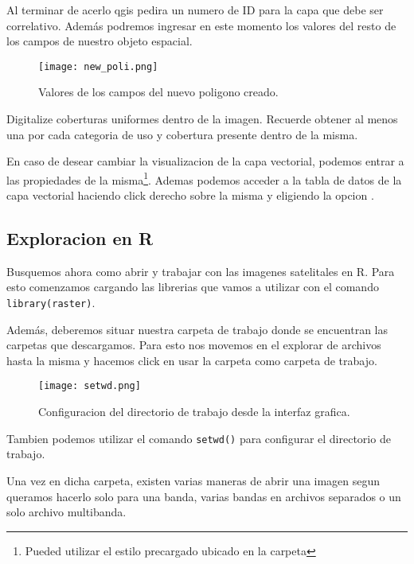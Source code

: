 Al terminar de acerlo qgis pedira un numero de ID para la capa que debe ser
correlativo. Además podremos ingresar en este momento los valores del resto de
los campos de nuestro objeto espacial.

\begin{figure}
\begin{center}
    \texttt{[image: new\_poli.png]}
\end{center}
    \caption{Valores de los campos del nuevo poligono creado.}
    \label{fig:newpoli}
\end{figure}

\begin{act}
   Digitalize coberturas uniformes dentro de la imagen. Recuerde obtener al
   menos una por cada categoria de uso y cobertura presente dentro de la misma.
\end{act}

En caso de desear cambiar la visualizacion de la capa vectorial, podemos entrar
a las propiedades de la misma\footnote{Pueded utilizar el estilo precargado
ubicado en la carpeta }. Ademas podemos acceder a la tabla de
datos de la capa vectorial haciendo click derecho sobre la misma y eligiendo la
opcion .

\subsection{Exploracion en R}
Busquemos ahora como abrir y trabajar con las imagenes satelitales en R. Para
esto comenzamos cargando las librerias que vamos a utilizar con el comando
\texttt{library(raster)}. 

Además, deberemos situar nuestra carpeta de trabajo donde se encuentran las
carpetas que descargamos. Para esto nos movemos en el explorar de archivos
hasta la misma y hacemos click en usar la carpeta como carpeta de trabajo.

\begin{figure}
\begin{center}
    \texttt{[image: setwd.png]}
\end{center}
\caption{Configuracion del directorio de trabajo desde la interfaz grafica.}
\label{fig:setwd}
\end{figure}

Tambien podemos utilizar el comando \texttt{setwd()} para configurar el
directorio de trabajo.

Una vez en dicha carpeta, existen varias maneras de abrir una imagen segun
queramos hacerlo solo para una banda, varias bandas en archivos separados o un
solo archivo multibanda.

